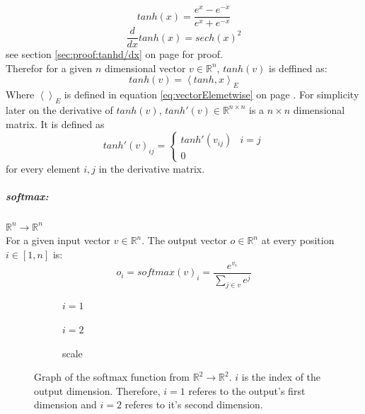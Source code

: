 \documentclass[12pt]{article}
\newcommand{\equationref}[1]{equation \ref{#1} on page \pageref{#1}}
\newcommand{\sectionref}[1]{section \ref{#1} on page \pageref{#1}}
\begin{document}
\begin{center}

\end{center}

\begin{equation} \label{eq:NN:tanh}
tanh(x) = \frac{e^x-e^{-x}}{e^x+e^{-x}}
\end{equation}\begin{equation} \label{eq:NN:tanh_derivative}
\frac{d}{dx}tanh(x) = sech(x)^2
\end{equation}
see \sectionref{sec:proof:tanhd/dx} for proof.\\
Therefor for a given \(n\) dimensional vector \(v \in \mathbb R^n\), \(tanh(v)\) is deffined as:
\begin{equation}\label{eq:vecTanh}
tanh(v) = \left<tanh, x\right>_E
\end{equation}
Where \(\left<\right>_E\) is defined in \equationref{eq:vectorElemetwise}. For simplicity later on the derivative of \(tanh(v)\), \(tanh'(v) \in \mathbb R^{n \times n}\) is a \(n \times n\) dimensional matrix. It is defined as
\begin{equation}
tanh'(v)_{ij} = \left\{\begin{matrix}
tanh'(v_{ij}) & i = j \\
0
\end{matrix}\right.
\end{equation}
for every element \(i,j\) in the derivative matrix.

\subparagraph*{softmax:} \(\mathbb{R}^n\to \mathbb{R}^n\)\\
\indent For a given input vector \(v \in \mathbb{R}^n\). The output vector \(o \in \mathbb{R}^n\) at every position \(i \in [1, n]\) is:
\begin{equation} \label{eq:NN:softmax}
o_i = softmax(v)_i = \frac{e^{v_i}}{\sum_{j \in v} e^j}
\end{equation}
\begin{figure}[H]
\centering
\begin{subfigure}{.4\textwidth}
  \centering
  
  \caption{\(i=1\)}
  \label{fig:sub1}
\end{subfigure}%
\begin{subfigure}{.4\textwidth}
  \centering
  
  \caption{\(i=2\)}
  \label{fig:sub2}
\end{subfigure}
\begin{subfigure}{.1\textwidth}
  \centering
  
  \caption*{scale}
\end{subfigure}
\caption{Graph of the softmax function from \(\mathbb R^2 \to \mathbb R^2\). \(i\) is the index of the output dimension. Therefore, \(i=1\) referes to the output's first dimension and \(i=2\) referes to it's second dimension.}
\label{fig:test}
\end{figure}
\end{document}
